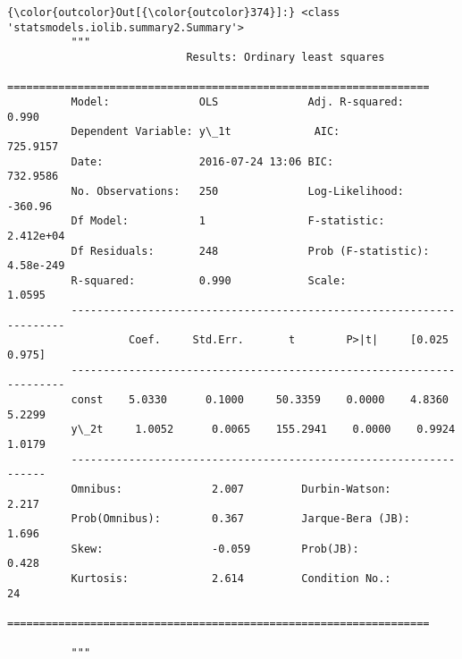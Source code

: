 \documentclass{article}
\begin{document}
            \begin{Verbatim}[commandchars=\\\{\}]
{\color{outcolor}Out[{\color{outcolor}374}]:} <class 'statsmodels.iolib.summary2.Summary'>
          """
                            Results: Ordinary least squares
          ==================================================================
          Model:              OLS              Adj. R-squared:     0.990    
          Dependent Variable: y\_1t             AIC:                725.9157 
          Date:               2016-07-24 13:06 BIC:                732.9586 
          No. Observations:   250              Log-Likelihood:     -360.96  
          Df Model:           1                F-statistic:        2.412e+04
          Df Residuals:       248              Prob (F-statistic): 4.58e-249
          R-squared:          0.990            Scale:              1.0595   
          ---------------------------------------------------------------------
                   Coef.     Std.Err.       t        P>|t|     [0.025    0.975]
          ---------------------------------------------------------------------
          const    5.0330      0.1000     50.3359    0.0000    4.8360    5.2299
          y\_2t     1.0052      0.0065    155.2941    0.0000    0.9924    1.0179
          ------------------------------------------------------------------
          Omnibus:              2.007         Durbin-Watson:           2.217
          Prob(Omnibus):        0.367         Jarque-Bera (JB):        1.696
          Skew:                 -0.059        Prob(JB):                0.428
          Kurtosis:             2.614         Condition No.:           24   
          ==================================================================
          
          """
\end{Verbatim}
        
\end{document}
